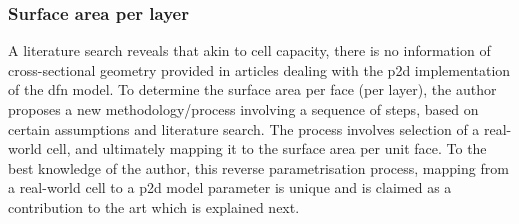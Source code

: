 \subsubsection*{Surface area per layer}\label{sec:surfareaperlayer}

A literature search reveals that akin  to cell capacity, there is no information
of  cross-sectional geometry  provided in  articles dealing  with the  \gls{p2d}
implementation of  the \gls{dfn} model. To  determine the surface area  per face
(per layer), the author proposes  a new methodology/process involving a sequence
of  steps, based  on  certain  assumptions and  literature  search. The  process
involves  selection of  a  real-world cell,  and ultimately  mapping  it to  the
surface area per  unit face. To the  best knowledge of the  author, this reverse
parametrisation process,  mapping from  a real-world cell  to a  \gls{p2d} model
parameter  is unique  and is  claimed  as a  contribution  to the  art which  is
explained next.

